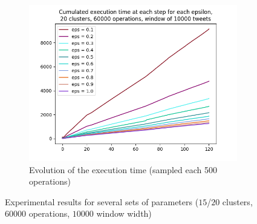 \documentclass[a4paper,10pt]{article}
\begin{document}
\begin{appendices}
\begin{figure}[h]
\begin{subfigure}[b]{0.3\textwidth}
		\includegraphics[width=\textwidth]{pictures/cumulated_execution_times_20_60000_10000.png}
		\caption{Evolution of the execution time (sampled each 500 operations)}
	\end{subfigure}
	
	\caption{Experimental results for several sets of parameters ($15$/$20$ clusters, $60000$ operations, $10000$ window width)}\label{fig:ABCD}
\label{plots}
\end{figure}


\end{appendices}
\end{document}

